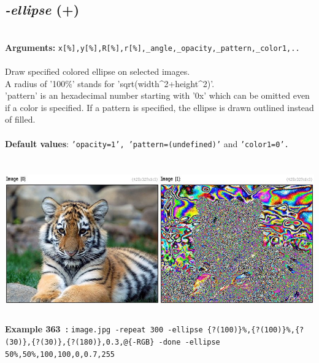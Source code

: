\documentclass[a4paper,11pt,twoside]{book}
\begin{document}
\subsection{\emph{-ellipse} (+)}\vspace*{-0.5em}
~\\\textbf{Arguments: } 
{\small \texttt{x[\%],y[\%],R[\%],r[\%],\_angle,\_opacity,\_pattern,\_color1,..}}\\~\\
Draw specified colored ellipse on selected images.
~\\A radius of '100\%' stands for 'sqrt(width\textasciicircum 2+height\textasciicircum 2)'.
~\\'pattern' is an hexadecimal number starting with '0x' which can be omitted
even if a color is specified. If a pattern is specified, the ellipse is
drawn outlined instead of filled.
~\\~\\\textbf{Default values}: {\small \texttt{'opacity=1', 'pattern=(undefined)'} and \texttt{'color1=0'.}}
\begin{center}\includegraphics[keepaspectratio=true,height=7cm,width=\textwidth]{img/gmic_def363.jpg}\\
{\footnotesize \textbf{Example 363~:} \texttt{image.jpg -repeat 300 -ellipse \{?(100)\}\%,\{?(100)\}\%,\{?(30)\},\{?(30)\},\{?(180)\},0.3,@\{-RGB\} -done -ellipse 50\%,50\%,100,100,0,0.7,255}}
\end{center}
\end{document}
